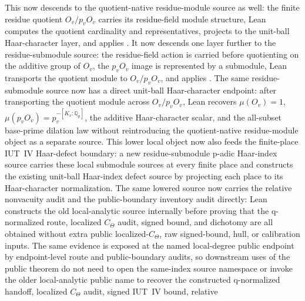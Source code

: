 \documentclass[11pt]{article}
\theoremstyle{plain}
\theoremstyle{definition}
\theoremstyle{remark}
\begin{document}
This now descends to the quotient-native residue-module source as well:
the finite residue quotient \(O_v/p_vO_v\) carries its residue-field module
structure, Lean computes the quotient cardinality and representatives, projects
to the unit-ball Haar-character layer, and applies
\texttt{}.
It now descends one layer further to the residue-submodule source: the
residue-field action is carried before quotienting on the additive group of
\(O_v\), the \(p_vO_v\) image is represented by a submodule, Lean transports
the quotient module to \(O_v/p_vO_v\), and applies
\texttt{}.
The same residue-submodule source now has a direct unit-ball Haar-character
endpoint: after transporting the quotient module across \(O_v/p_vO_v\), Lean
recovers \(\mu(O_v)=1\), \(\mu(p_vO_v)=p_v^{-[K_v:\mathbb Q_p]}\), the additive
Haar-character scalar, and the all-subset base-prime dilation law without
reintroducing the quotient-native residue-module object as a separate source.
This lower local object now also feeds the finite-place IUT~IV Haar-defect
boundary: a new residue-submodule p-adic Haar-index source carries these local
submodule sources at every finite place and constructs the existing unit-ball
Haar-index defect source by projecting each place to its Haar-character
normalization.
The same lowered source now carries the relative nonvacuity audit and the
public-boundary inventory audit directly: Lean constructs the old
local-analytic source internally before proving that the q-normalized route,
localized \(C_\Theta\) audit, signed bound, and dichotomy are all obtained
without extra public localized-\(C_\Theta\), raw signed-bound, hull, or
calibration inputs.
The same evidence is exposed at the named local-degree public endpoint by
endpoint-level route and public-boundary audits, so downstream uses of the
public theorem do not need to open the same-index source namespace or invoke
the older local-analytic public name to recover the constructed q-normalized
handoff, localized \(C_\Theta\) audit, signed IUT~IV bound, relative
\end{document}
